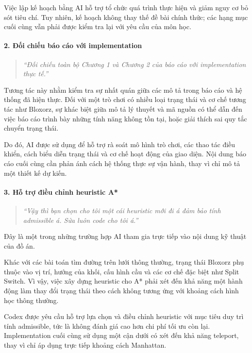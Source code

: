 Việc lập kế hoạch bằng AI hỗ trợ tổ chức quá trình thực hiện và giảm nguy cơ bỏ sót tiêu chí. Tuy nhiên, kế hoạch không thay thế đề bài chính thức; các hạng mục cuối cùng vẫn phải được kiểm tra lại với yêu cầu của môn học.

\paragraph{2. Đối chiếu báo cáo với implementation}
\begin{quote}
\textit{``Đối chiếu toàn bộ Chương 1 và Chương 2 của báo cáo với implementation thực tế.''}
\end{quote}

Tương tác này nhằm kiểm tra sự nhất quán giữa các mô tả trong báo cáo và hệ thống đã hiện thực. Đối với một trò chơi có nhiều loại trạng thái và cơ chế tương tác như Bloxorz, sự khác biệt giữa mô tả lý thuyết và mã nguồn có thể dẫn đến việc báo cáo trình bày những tính năng không tồn tại, hoặc giải thích sai quy tắc chuyển trạng thái.

Do đó, AI được sử dụng để hỗ trợ rà soát mô hình trò chơi, các thao tác điều khiển, cách biểu diễn trạng thái và cơ chế hoạt động của giao diện. Nội dung báo cáo cuối cùng cần phản ánh cách hệ thống thực sự vận hành, thay vì chỉ mô tả một thiết kế dự kiến.

\paragraph{3. Hỗ trợ điều chỉnh heuristic A*}
\begin{quote}
\textit{``Vậy thì bạn chọn cho tôi một cái heuristic mới đi á đảm bảo tính admissible á. Sửa luôn code cho tôi á.''}
\end{quote}

Đây là một trong những trường hợp AI tham gia trực tiếp vào nội dung kỹ thuật của đồ án.

Khác với các bài toán tìm đường trên lưới thông thường, trạng thái Bloxorz phụ thuộc vào vị trí, hướng của khối, cấu hình cầu và các cơ chế đặc biệt như Split Switch. Vì vậy, việc xây dựng heuristic cho A* phải xét đến khả năng một hành động làm thay đổi trạng thái theo cách không tương ứng với khoảng cách hình học thông thường.

Codex được yêu cầu hỗ trợ lựa chọn và điều chỉnh heuristic với mục tiêu duy trì tính admissible, tức là không đánh giá cao hơn chi phí tối ưu còn lại. Implementation cuối cùng sử dụng một cận dưới có xét đến khả năng teleport, thay vì chỉ áp dụng trực tiếp khoảng cách Manhattan.


